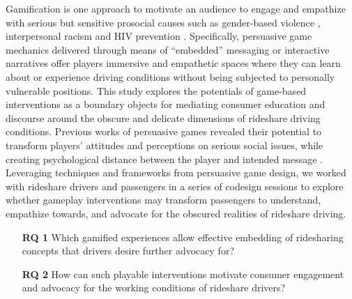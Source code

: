 Gamification is one approach to motivate an audience to engage and empathize with serious but sensitive prosocial causes such as gender-based violence \cite{standbyme}, interpersonal racism \cite{provotypes} and HIV prevention \cite{hiv}. Specifically, persuasive game mechanics delivered through means of ``embedded'' messaging or interactive narratives offer players immersive and empathetic spaces where they can learn about or experience driving conditions without being subjected to personally vulnerable positions.
This study explores the potentials of game-based interventions as a boundary objects for mediating consumer education and discourse around the obscure and delicate dimensions of rideshare driving conditions. 
Previous works of persuasive games revealed their potential to transform players' attitudes and perceptions on serious social issues, while creating psychological distance between the player and intended message \cite{transformational}. Leveraging techniques and frameworks from persuasive game design, we worked with rideshare drivers and passengers in a series of codesign sessions to explore whether gameplay interventions may transform passengers to understand, empathize towards, and advocate for the obscured realities of rideshare driving.


\begin{enumerate}
\item[\textbf{RQ 1}] 
Which gamified experiences allow effective embedding of ridesharing concepts that drivers desire further advocacy for?

\item[\textbf{RQ 2}] How can such playable interventions motivate consumer engagement and advocacy for the working conditions of rideshare drivers?

\end{enumerate}



